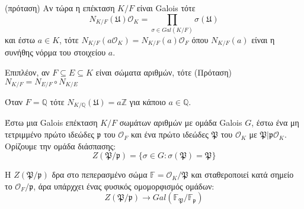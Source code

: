 \documentclass[oneside,a4paper]{article}
\newcommand {\tl}{\textlatin}
\newcommand{\Z}{\mathbb{Z}}
\newcommand{\Q}{\mathbb{Q}}
\begin{document}
(πρόταση) Αν τώρα η επέκταση $K/F$ είναι \tl{Galois} τότε $$N_{K/F} (\mathfrak{U}) \mathcal{O}_K =\prod\limits_{\sigma \in Gal(K/F)} \sigma( \mathfrak{U})$$
και έστω $a \in K$, τότε $N_{K/F}(a \mathcal{O}_K) = N_{K/F}(a)\mathcal{O}_F$ όπου $N_{K/F}(a)$ είναι η συνήθης νόρμα του στοιχείου $a$.

Επιπλέον, αν $F\subseteq E \subseteq K$ είναι σώματα αριθμών, τότε (Πρόταση)
$N_{K/F} = N_{E/F} \circ N_{K/E}$

Όταν $F = \Q$ τότε $N_{K/\Q} (\mathfrak{U}) = a \Z$ για κάποιο $a \in \Q$. 


Έστω μια \tl{Galois} επέκταση $K/F$ σωμάτων αριθμών με ομάδα \tl{Galois} $G$, έστω ένα μη τετριμμένο πρώτο ιδεώδες $\mathfrak{p}$ του $\mathcal{O}_F$ και ένα πρώτο ιδεώδες $\mathfrak{P}$ του $\mathcal{O}_K$ με $\mathfrak{P}|\mathfrak{p}\mathcal{O}_K$. Ορίζουμε την ομάδα διάσπασης:
$$Z(\mathfrak{P}/\mathfrak{p}) = \{\sigma \in G: \sigma(\mathfrak{P}) = \mathfrak{P}\}$$


Η $Z(\mathfrak{P}/\mathfrak{p})$ δρα στο πεπερασμένο σώμα $\mathbb{F} = \mathcal{O}_K/\mathfrak{P}$ και σταθεροποιεί κατά σημείο το $\mathcal{O}_F/\mathfrak{p}$, άρα υπάρχχει ένας φυσικός ομομορφισμός ομάδων:
$$Z(\mathfrak{P}/\mathfrak{p}) \longrightarrow Gal(\mathbb{F}_{\mathfrak{P}}/\mathbb{F}_{\mathfrak{p}})$$
\end{document}
